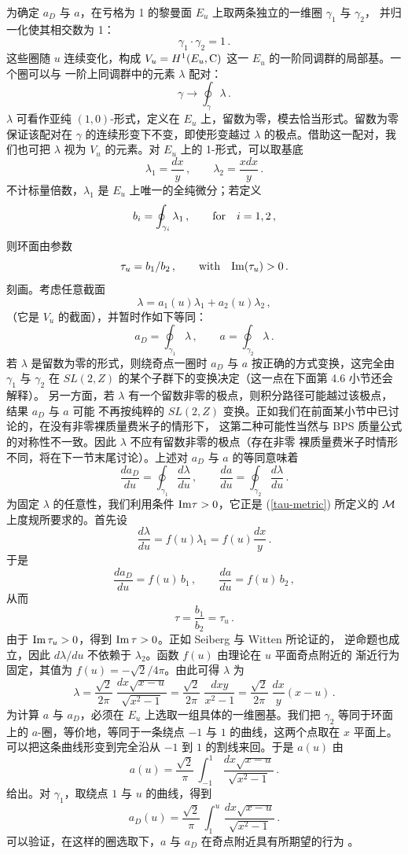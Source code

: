 为确定 $a_D$ 与 $a$，在亏格为 1 的黎曼面 $E_u$ 上取两条独立的一维圈 $\gamma_1$ 与 $\gamma_2$，
并归一化使其相交数为 1：
$$
\gamma_1 \cdot \gamma_2 = 1\,.
$$
这些圈随 $u$ 连续变化，构成 $V_u=H^1(E_u,{\rm C})$ 这一 $E_u$ 的一阶同调群的局部基。一个圈可以与
一阶上同调群中的元素 $\lambda$ 配对：
$$
\gamma \rightarrow  \oint_{\gamma} \lambda\,.
$$
$\lambda$ 可看作亚纯 $(1,0)$-形式，定义在 $E_u$ 上，留数为零，模去恰当形式。留数为零保证该配对在
$\gamma$ 的连续形变下不变，即使形变越过 $\lambda$ 的极点。借助这一配对，我们也可把 $\lambda$
视为 $V_u$ 的元素。对 $E_u$ 上的 1-形式，可以取基底
$$
\lambda_{1} = \frac{dx}{y}\,, \qquad \lambda_{2} = \frac{xdx}{y}\,.
$$
不计标量倍数，$\lambda_1$ 是 $E_u$ 上唯一的全纯微分；若定义
$$
b_i=\oint_{\gamma_i}\lambda_1\,,\qquad{\rm for}\quad i = 1,2\,,
$$
则环面由参数
$$
\tau_u = b_1/b_2\,,\qquad {\rm with} \quad {\rm Im}(\tau_u) > 0\,. 
$$
刻画。考虑任意截面
$$
\lambda = a_1(u) \lambda_1 + a_2 (u) \lambda_2\,,
$$
（它是 $V_u$ 的截面），并暂时作如下等同：
$$
a_D=\oint_{\gamma_1}\lambda\,,\qquad a=\oint_{\gamma_2}\lambda\,.
$$
若 $\lambda$ 是留数为零的形式，则绕奇点一圈时 $a_D$ 与 $a$ 按正确的方式变换，这完全由
$\gamma_1$ 与 $\gamma_2$ 在 $SL(2,Z)$ 的某个子群下的变换决定（这一点在下面第 4.6 小节还会解释）。
另一方面，若 $\lambda$ 有一个留数非零的极点，则积分路径可能越过该极点，结果 $a_D$ 与 $a$ 可能
不再按纯粹的 $SL(2,Z)$ 变换。正如我们在前面某小节中已讨论的，在没有非零裸质量费米子的情形下，
这第二种可能性当然与 BPS 质量公式的对称性不一致。因此 $\lambda$ 不应有留数非零的极点（存在非零
裸质量费米子时情形不同，将在下一节末尾讨论）。上述对 $a_D$ 与 $a$ 的等同意味着
$$
\frac{da_D}{du}=\oint_{\gamma_1}\frac{d\lambda}{du}\,,\qquad
\frac{da}{du}=\oint_{\gamma_2}\frac{d\lambda}{du}\,.
$$
为固定 $\lambda$ 的任意性，我们利用条件 ${\rm Im}\tau > 0$，它正是 (\ref{tau-metric}) 所定义的
${\cal M}$ 上度规所要求的。首先设
$$
\frac{d\lambda}{du} = f(u) \lambda_{1} = f(u) \frac{dx}{y}\,.
$$
于是
$$
\frac{da_{D}}{du} = f(u)\,b_1\,,\qquad \frac{da}{du} = f(u)\,b_2\,,
$$
从而
$$
\tau = \frac{b_1}{b_2} = \tau_u\,. 
$$
由于 ${\rm Im}\,\tau_u > 0$，得到 ${\rm Im}\,\tau >0$。正如 Seiberg 与 Witten 所论证的，
逆命题也成立，因此 $d\lambda/du$ 不依赖于 $\lambda_2$。函数 $f(u)$ 由理论在 $u$ 平面奇点附近的
渐近行为固定，其值为 $f(u)=-\sqrt{2}/4\pi$。由此可得 $\lambda$ 为
$$
\lambda=\frac{\sqrt{2}}{2\pi}\;\frac{dx\sqrt{x-u}}{\sqrt{x^2-1}}=  
\frac{\sqrt{2}}{2\pi}\;\frac{dx y}{x^2-1}=\frac{\sqrt{2}}{2\pi}\;
\frac{dx}{y} (x-u) \,.
$$
为计算 $a$ 与 $a_D$，必须在 $E_u$ 上选取一组具体的一维圈基。我们把 $\gamma_2$ 等同于环面上的
$a$-圈，等价地，等同于一条绕点 $-1$ 与 $1$ 的曲线，这两个点取在 $x$ 平面上。可以把这条曲线形变到完全沿从 $-1$
到 $1$ 的割线来回。于是 $a(u)$ 由
\begin{equation}
a(u)=\frac{\sqrt{2}}{\pi}\,\int_{-1}^1\,\frac{dx\sqrt{x-u}}{\sqrt{x^2-1}}\,.
\label{au}
\end{equation}
给出。对 $\gamma_1$，取绕点 $1$ 与 $u$ 的曲线，得到
\begin{equation}
a_D(u)=\frac{\sqrt{2}}{\pi}\,\int_{1}^u\,\frac{dx\sqrt{x-u}}{\sqrt{x^2-1}}\,.
\label{adu}
\end{equation}
可以验证，在这样的圈选取下，$a$ 与 $a_D$ 在奇点附近具有所期望的行为 \cite{SW-I}。

